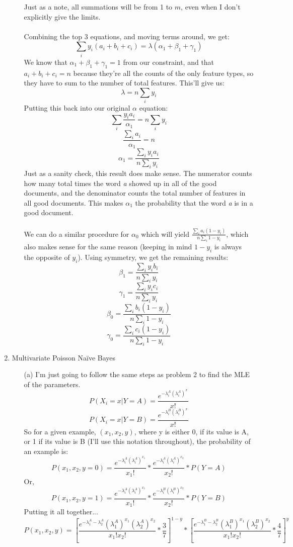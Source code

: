 \begin{enumerate}
\begin{enumerate}
    Just as a note, all summations will be from 1 to $m$, even when I don't explicitly give the limits.\\\\
    Combining the top 3 equations, and moving terms around, we get:
    $$\sum_i y_i(a_i+b_i+c_i) = \lambda(\alpha_1+\beta_1+\gamma_1)$$
    We know that $\alpha_1+\beta_1+\gamma_1 = 1$ from our constraint, and that $a_i+b_i+c_i = n$ because they're all the counts of the only feature types, so they have to sum to the number of total features. This'll give us:
    $$\lambda = n \sum_i y_i$$
    Putting this back into our original $\alpha$ equation:
    $$\sum_i \frac{y_ia_i}{\alpha_1}= n \sum_i y_i$$
    $$\frac{\sum_i a_i}{\alpha_1} = n$$
    $$\alpha_1 = \frac{\sum_i y_i a_i}{n \sum_i y_i}$$
    Just as a sanity check, this result does make sense. The numerator counts how many total times the word \textit{a} showed up in all of the good documents, and the denominator counts the total number of features in all good documents. This makes $\alpha_1$ the probability that the word \textit{a} is in a good document.\\\\
    We can do a similar procedure for $\alpha_0$ which will yield $\frac{\sum_i a_i(1-y_i)}{n \sum_i 1-y_i}$, which also makes sense for the same reason (keeping in mind $1-y_i$ is always the opposite of $y_i$).
    Using symmetry, we get the remaining results:
    $$\beta_1 = \frac{\sum_i y_i b_i}{n \sum_i y_i}$$
    $$\gamma_1 = \frac{\sum_i y_i c_i}{n \sum_i y_i}$$
    $$\beta_0 = \frac{\sum_i b_i(1-y_i)}{n \sum_i 1-y_i}$$
    $$\gamma_0 = \frac{\sum_i c_i(1-y_i)}{n \sum_i 1-y_i}$$

    
  \end{enumerate}
\item Multivariate Poisson Na{\"i}ve Bayes
  \begin{enumerate}
  \item[(a)]
    I'm just going to follow the same steps as problem 2 to find the MLE of the parameters.
    $$P(X_i=x|Y=A) = \frac{e^{-\lambda_i^A(\lambda_i^A)^x}}{x!}$$
    $$P(X_i=x|Y=B) = \frac{e^{-\lambda_i^B(\lambda_i^B)^x}}{x!}$$
    So for a given example, $(x_1,x_2,y)$, where y is either 0, if its value is A, or 1 if its value is B (I'll use this notation throughout), the probability of an example is:
    $$P(x_1,x_2,y=0) = \frac{e^{-\lambda_i^A(\lambda_i^A)^{x_1}}}{x_1!} * \frac{e^{-\lambda_i^A(\lambda_i^A)^{x_2}}}{x_2!} * P(Y=A)$$
    Or,
    $$P(x_1,x_2,y=1) = \frac{e^{-\lambda_i^A(\lambda_i^A)^{x_1}}}{x_1!} * \frac{e^{-\lambda_i^B(\lambda_i^B)^{x_2}}}{x_2!} * P(Y=B)$$
    Putting it all together...
    $$P(x_1,x_2,y) = [\frac{e^{-\lambda_1^A-\lambda_2^A}(\lambda_1^A)^{x_1}(\lambda_2^A)^{x_2}}{x_1!x_2!}*\frac{3}{7}]^{1-y}*[\frac{e^{-\lambda_1^B-\lambda_2^B}(\lambda_1^B)^{x_1}(\lambda_2^B)^{x_2}}{x_1!x_2!}*\frac{4}{7}]^{y}$$


\end{enumerate}
\end{enumerate}
